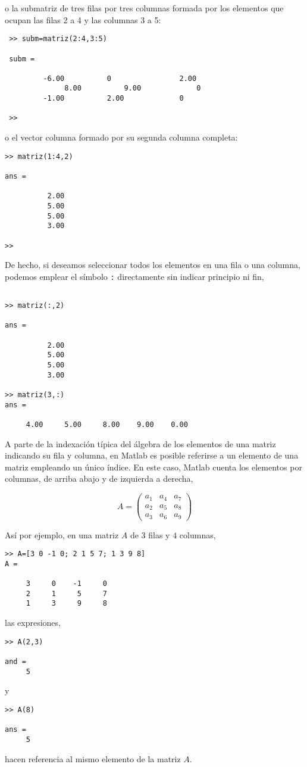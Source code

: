  o la submatriz de tres filas por tres columnas formada por los elementos que ocupan las filas 2 a 4 y las columnas 3 a 5:
\begin{verbatim}
 >> subm=matriz(2:4,3:5)

 subm =

         -6.00          0                2.00
	          8.00          9.00             0  
         -1.00          2.00             0  

 >> 
\end{verbatim}

o el vector columna formado por su segunda columna completa:
\begin{verbatim}
>> matriz(1:4,2)

ans =

          2.00
          5.00
          5.00
          3.00

>> 
\end{verbatim} 

De hecho, si deseamos seleccionar todos los elementos en una fila o una columna, podemos emplear el símbolo \texttt{:} directamente sin indicar principio ni fin,

\begin{verbatim}

>> matriz(:,2)

ans =

          2.00
          5.00
          5.00
          3.00

>> matriz(3,:)
ans =

     4.00     5.00     8.00    9.00    0.00
\end{verbatim}
 
\label{index}A parte de la indexación típica del álgebra de los elementos de una matriz indicando su fila y columna, en Matlab es posible referirse a un  elemento de una matriz empleando un único índice. En este caso, Matlab cuenta los elementos por columnas, de arriba abajo y de izquierda a derecha, 

\begin{equation*}
A=
\begin{pmatrix}
a_1&a_4&a_7\\
a_2&a_5&a_8\\
a_3&a_6&a_9
\end{pmatrix}
\end{equation*}

Así por ejemplo, en una matriz $A$ de $3$ filas y $4$ columnas, 
\begin{verbatim}
>> A=[3 0 -1 0; 2 1 5 7; 1 3 9 8]
A =

     3     0    -1     0
     2     1     5     7
     1     3     9     8
\end{verbatim}
las expresiones,
\begin{verbatim}
>> A(2,3)

and =
     5
\end{verbatim}
y
\begin{verbatim}
>> A(8)

ans =
     5
\end{verbatim} 
hacen referencia al mismo elemento de la matriz $A$. 

